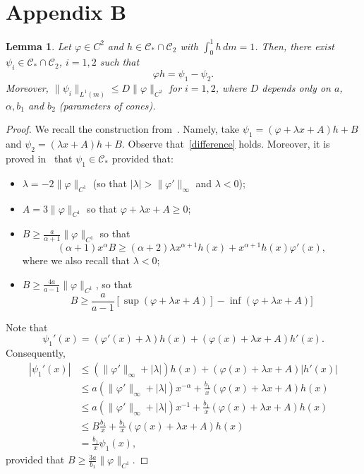 \documentclass[12pt,reqno,a4paper]{article}
\newtheorem{lemma}[theorem]{Lemma}
\begin{document}
\section{Appendix B}
\begin{lemma}\label{auxiliary}
	Let $\varphi \in C^2$ and $h\in \mathcal C_*\cap \mathcal C_2$ with $\int_0^1 h\, dm=1$. Then, there exist $\psi_i\in \mathcal C_*\cap \mathcal C_2$, $i=1, 2$ such that 
	\begin{equation}\label{difference}
		\varphi h=\psi_1-\psi_2.
	\end{equation}
	Moreover, $\|\psi_i\|_{L^1(m)}\le D\|\varphi\|_{C^2}$ for $i=1, 2$,  where $D$ depends only on $a$, $\alpha, b_1$ and $b_2$ (parameters of cones). 
\end{lemma}
\begin{proof}
	We recall the construction from~\cite{NPT}. Namely,
	take $\psi_1=(\varphi+\lambda x+A)h+B$ and $\psi_2=(\lambda x+A)h+B$. Observe that~\eqref{difference} holds. Moreover, it is proved in~\cite{NPT} that $\psi_1\in \mathcal C_*$ provided that:
	\begin{itemize}
		\item $\lambda=-2\|\varphi\|_{C^1}$ (so that $|\lambda|>\|\varphi'\|_{\infty}$ and $\lambda<0$);
		\item $A=3\|\varphi\|_{C^1}$ so that $\varphi+\lambda x+A\ge 0$;
		\item $B\ge \frac{a}{\alpha+1}\|\varphi\|_{C^1}$ so that 
		\[
		(\alpha+1)x^\alpha B\ge (\alpha+2)\lambda x^{\alpha+1}h(x)+x^{\alpha+1}h(x)\varphi'(x),
		\]
		where we also recall that $\lambda<0$;
		\item $B\ge \frac{4a}{a-1}\|\varphi\|_{C^1}$, so that 
		\[
		B\ge \frac{a}{a-1}[\sup(\varphi +\lambda x+A)]-\inf (\varphi+\lambda x+A)]
		\]
	\end{itemize}
	
	Note that 
	\[
	\psi_1'(x)=(\varphi'(x)+\lambda)h(x)+(\varphi(x)+\lambda x+A)h'(x).
	\]
	Consequently, 
	\[
	\begin{split}
		|\psi_1'(x)| &\le (\|\varphi'\|_\infty+|\lambda|)h(x)+ (\varphi(x)+\lambda x+A)|h'(x)| \\
		&\le a(\|\varphi'\|_\infty+|\lambda|)x^{-\alpha}+\frac{b_1}{x}(\varphi(x)+\lambda x+A)h(x) \\
		&\le a(\|\varphi'\|_\infty+|\lambda|)x^{-1}+\frac{b_1}{x}(\varphi(x)+\lambda x+A)h(x)\\
		&\le B \frac{b_1}{x}+\frac{b_1}{x}(\varphi(x)+\lambda x+A)h(x)\\
		&=\frac{b_1}{x}\psi_1(x),
	\end{split}
	\]
	provided that $B\ge \frac{3a}{b_1}\|\varphi\|_{C^1}$.
	

\end{proof}
\end{document}
